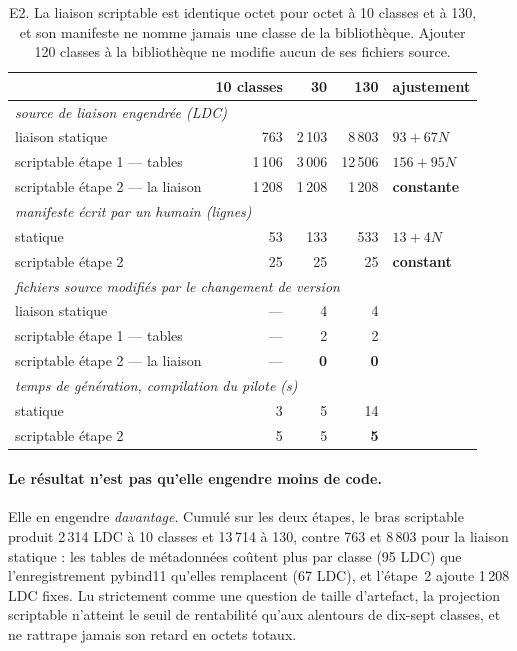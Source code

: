 \documentclass[11pt,a4paper]{article}
\begin{document}
\begin{table}[h]
\centering\small
\begin{tabular}{lrrrl}
\toprule
 & 10 classes & 30 & 130 & ajustement \\
\midrule
\multicolumn{5}{l}{\itshape source de liaison engendrée (LDC)} \\
liaison statique                    & 763 & 2\,103 & 8\,803 & $93 + 67N$ \\
scriptable étape 1 --- tables       & 1\,106 & 3\,006 & 12\,506 & $156 + 95N$ \\
scriptable étape 2 --- la liaison   & 1\,208 & 1\,208 & 1\,208 & \textbf{constante} \\
\midrule
\multicolumn{5}{l}{\itshape manifeste écrit par un humain (lignes)} \\
statique                            & 53 & 133 & 533 & $13 + 4N$ \\
scriptable étape 2                  & 25 & 25 & 25 & \textbf{constant} \\
\midrule
\multicolumn{5}{l}{\itshape fichiers source modifiés par le changement de version} \\
liaison statique                    & --- & 4 & 4 & \\
scriptable étape 1 --- tables       & --- & 2 & 2 & \\
scriptable étape 2 --- la liaison   & --- & \textbf{0} & \textbf{0} & \\
\midrule
\multicolumn{5}{l}{\itshape temps de génération, compilation du pilote (s)} \\
statique                            & 3 & 5 & 14 & \\
scriptable étape 2                  & 5 & 5 & \textbf{5} & \\
\bottomrule
\end{tabular}
\caption{E2. La liaison scriptable est identique octet pour octet à 10 classes et
à 130, et son manifeste ne nomme jamais une classe de la bibliothèque. Ajouter
120 classes à la bibliothèque ne modifie aucun de ses fichiers source.}
\label{tab:e2}
\end{table}

\paragraph{Le résultat n'est pas qu'elle engendre moins de code.} Elle en
engendre \emph{davantage}. Cumulé sur les deux étapes, le bras scriptable produit
2\,314 LDC à 10 classes et 13\,714 à 130, contre 763 et 8\,803 pour la liaison
statique : les tables de métadonnées coûtent plus par classe (95 LDC) que
l'enregistrement pybind11 qu'elles remplacent (67 LDC), et l'étape~2 ajoute
1\,208 LDC fixes. Lu strictement comme une question de taille d'artefact, la
projection scriptable n'atteint le seuil de rentabilité qu'aux alentours de
dix-sept classes, et ne rattrape jamais son retard en octets totaux.
\end{document}
